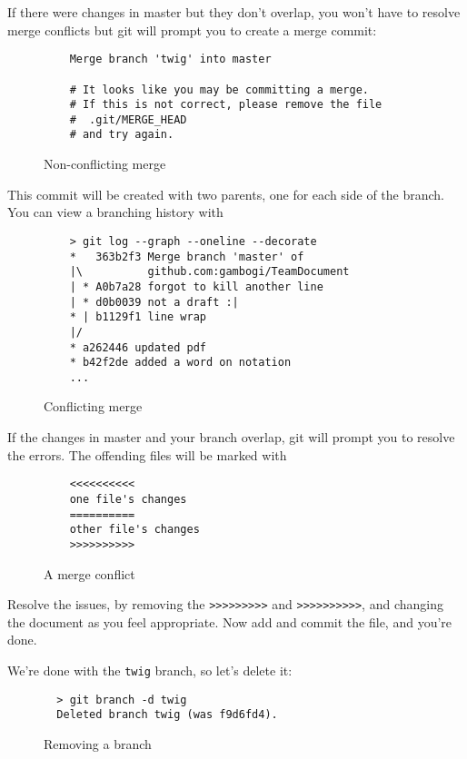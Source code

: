 \documentclass[11pt]{report}
\begin{document}
If there were changes in master but they don't overlap, you won't have
to resolve merge conflicts but git will prompt you to create a merge
commit:

\begin{figure}[H]
  \caption{Non-conflicting merge}
  \begin{lstlisting}
    Merge branch 'twig' into master
    
    # It looks like you may be committing a merge.
    # If this is not correct, please remove the file
    #  .git/MERGE_HEAD
    # and try again.
  \end{lstlisting}
\end{figure}

This commit will be created with two parents, one for each side of the
branch. You can view a branching history with

\begin{figure}[H]
  \caption{Conflicting merge}
  \begin{lstlisting}
    > git log --graph --oneline --decorate
    *   363b2f3 Merge branch 'master' of
    |\          github.com:gambogi/TeamDocument
    | * A0b7a28 forgot to kill another line
    | * d0b0039 not a draft :|
    * | b1129f1 line wrap
    |/  
    * a262446 updated pdf
    * b42f2de added a word on notation
    ...
  \end{lstlisting}
\end{figure}

If the changes in master and your branch overlap, git will prompt you
to resolve the errors. The offending files will be marked with

\begin{figure}[H]
  \caption{A merge conflict}
  \begin{lstlisting}
    <<<<<<<<<<
    one file's changes
    ==========
    other file's changes
    >>>>>>>>>>
  \end{lstlisting}
\end{figure}

Resolve the issues, by removing the \texttt{>>>>>>>>>}
and \texttt{>>>>>>>>>>}, and changing the document as you feel appropriate.
Now add and commit the file, and you're done.

We're done with the \texttt{twig} branch, so let's delete it:
\begin{figure}[H]
  \caption{Removing a branch}
  \begin{lstlisting}
  > git branch -d twig
  Deleted branch twig (was f9d6fd4).
  \end{lstlisting}
\end{figure}
\end{document}
